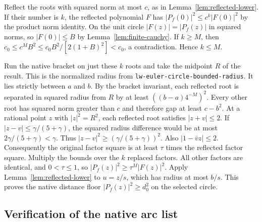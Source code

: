 \documentclass[11pt]{amsart}
\theoremstyle{definition}
\theoremstyle{remark}
\numberwithin{equation}{section}
\newcommand{\code}[1]{\nolinkurl{#1}}
\begin{document}
Reflect the roots with squared norm at most $c$, as in
Lemma~\ref{lem:reflected-lower}. If their number is $k$, the
reflected polynomial $F$ has
$|P_f(0)|^2\le c^k |F(0)|^2$ by the product norm identity.
On the unit circle $|F(z)|=|P_f(z)|$ in squared norms,
so $|F(0)|\le B$ by Lemma~\ref{lem:finite-cauchy}.
If $k\ge M$, then $c_0\le c^M B^2\le
c_0B^2/[2(1+B)^2]<c_0$, a contradiction. Hence
$k\le M$.

Run the native bracket on just these $k$ roots and take
the midpoint $R$ of the result. This is the normalized
radius from \code{lw-euler-circle-bounded-radius}.
It lies strictly between $a$ and $b$. By the bracket
invariant, each reflected root is separated in squared
radius from $R$ by at least $((b-a)4^{-M})^2$.
Every other root has squared norm greater than $c$ and
therefore gap at least $c-b^2$. At a rational point $z$
with $|z|^2=R^2$, each reflected root satisfies $|z+v|\le2$.
If $|z-v|\le\gamma/(5+\gamma)$, the squared radius
difference would be at most $2\gamma/(5+\gamma)<\gamma$.
Thus $|z-v|^2\ge(\gamma/(5+\gamma))^2$.
Also $|1-\bar vz|\le2$. Consequently the original
factor square is at least $\tau$ times the reflected
factor square. Multiply the bounds over the $k$ replaced
factors. All other factors are identical, and $0<\tau\le1$,
so $|P_f(z)|^2\ge\tau^M|F(z)|^2$.
Apply Lemma~\ref{lem:reflected-lower} to $u=z/s$,
which has radius at most $b/s$. This proves the native
distance floor $|P_f(z)|^2\ge d_0^2$ on the selected circle.

\subsection{Verification of the native arc list}
\end{document}
